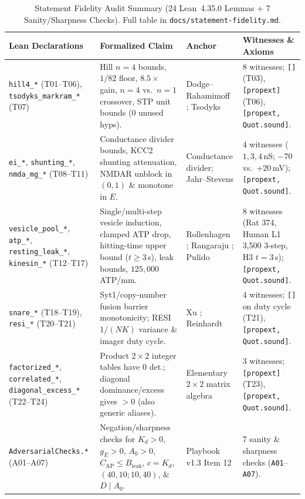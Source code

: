 \documentclass[11pt,letterpaper]{amsart}
\begin{document}
\begin{table}[htbp]
\centering
\caption{Statement Fidelity Audit Summary (24 Lean~4.35.0 Lemmas + 7 Sanity/Sharpness Checks). Full table in \texttt{docs/statement-fidelity.md}.}
\label{tab:fidelity}
\footnotesize
\begin{tabularx}{\textwidth}{@{}>{\raggedright\arraybackslash}p{4.25cm}>{\raggedright\arraybackslash}p{4.25cm}>{\raggedright\arraybackslash}p{2.75cm}L@{}}
\toprule
\textbf{Lean Declarations} & \textbf{Formalized Claim} & \textbf{Anchor} & \textbf{Witnesses \& Axioms} \\
\midrule
\texttt{hill4\_*} (T01--T06), \texttt{tsodyks\_markram\_*} (T07) & Hill $n=4$ bounds, $1/82$ floor, $8.5\times$ gain, $n=4$ vs.\ $n=1$ crossover, STP unit bounds (0 unused hyps). & Dodge--Rahamimoff \cite{dodge1967calcium}; Tsodyks \cite{tsodyks1998dynamic} & 8 witnesses; \texttt{[]} (T03), \texttt{[propext]} (T06), \texttt{[propext, Quot.sound]}. \\
\texttt{ei\_*}, \texttt{shunting\_*}, \texttt{nmda\_mg\_*} (T08--T11) & Conductance divider bounds, KCC2 shunting attenuation, NMDAR unblock in $(0,1)$ \& monotone in $E$. & Conductance divider; Jahr--Stevens \cite{jahr1990nmda} & 4 witnesses ($1,3,4\,$nS; $-70$ vs.\ $+20\,$mV); \texttt{[propext, Quot.sound]}. \\
\texttt{vesicle\_pool\_*}, \texttt{atp\_*}, \texttt{resting\_leak\_*}, \texttt{kinesin\_*} (T12--T17) & Single/multi-step vesicle induction, clamped ATP drop, hitting-time upper bound ($t\ge 3\,$s), leak bounds, $125{,}000\,$ATP/mm. & Rollenhagen \cite{rollenhagen2024l1}; Rangaraju \cite{rangaraju2014atp}; Pulido \cite{pulido2021resting} & 8 witnesses (Rat 374, Human L1 3,500 3-step, H3 $t=3\,$s); \texttt{[propext, Quot.sound]}. \\
\texttt{snare\_*} (T18--T19), \texttt{resi\_*} (T20--T21) & Syt1/copy-number fusion barrier monotonicity; RESI $1/(N K)$ variance \& imager duty cycle. & Xu \cite{xu2016dnaorigami}; Reinhardt \cite{reinhardt2023resi} & 4 witnesses; \texttt{[]} on duty cycle (T21), \texttt{[propext, Quot.sound]}. \\
\texttt{factorized\_*}, \texttt{correlated\_*}, \texttt{diagonal\_excess\_*} (T22--T24) & Product $2\times 2$ integer tables have $0$ det.; diagonal dominance/excess gives $>0$ (also generic aliases). & Elementary $2\times 2$ matrix algebra & 3 witnesses; \texttt{[propext]} (T23), \texttt{[propext, Quot.sound]}. \\
\texttt{AdversarialChecks.*} (A01--A07) & Negation/sharpness checks for $K_d>0$, $g_E>0$, $A_0>0$, $C_{\mathrm{AP}}\le B_{\mathrm{leak}}$, $c=K_d$, $(40,10;10,40)$, \& $D \mid A_0$. & Playbook v1.3 Item 12 & 7 sanity \& sharpness checks (\texttt{A01}--\texttt{A07}). \\
\bottomrule
\end{tabularx}
\end{table}
\end{document}

